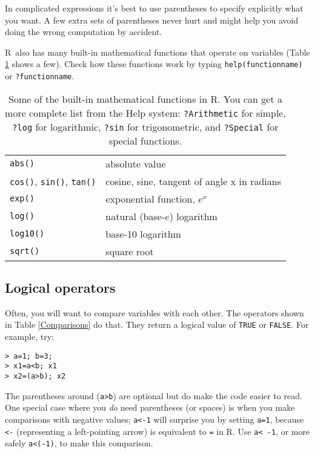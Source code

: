 \documentclass [11pt]{article}
\newcommand{\code}[1]{{\tt #1}}
\newcommand\R{{\sf R}}
\numberwithin{exercise}{section}
\begin{document}
In complicated expressions it's best to use parentheses to specify 
explicitly what you want. A few extra sets of parentheses
never hurt and might help you avoid doing the wrong computation by accident.

\R\ also has many built-in mathematical functions that operate on variables
(Table \ref{MathFunctions} shows a few). Check how these functions work by typing \code{help(functionname)} or \code{?functionname}. 
\begin{table}[t]
\begin{tabular}{p{140pt}p{290pt}}
\hline
\code{abs()} & absolute value \\
\code{cos()}, \code{sin()}, \code{tan()} &  cosine, sine, tangent of angle x in radians\\
\code{exp()}  & exponential function, $e^x$  \\
\code{log()}  & natural (base-$e$) logarithm \\
\code{log10()} &   base-10 logarithm \\
\code{sqrt()}  &  square root \\
\hline 
\end{tabular}
\caption{Some of the built-in mathematical functions in \R. You can
get a more complete list from the Help system: \code{?Arithmetic} for simple, 
\code{?log} for logarithmic, \code{?sin} for trigonometric, and \code{?Special} for special functions.} 
\label{MathFunctions}
\end{table}

\subsection{Logical operators}
Often, you will want to compare variables with each other. 
The operators shown in Table \ref{Comparisons} do that. They return a logical value of \code{TRUE} or \code{FALSE}. 
For example, try:  
\vspace{-0.1in}
\begin{verbatim}
> a=1; b=3; 
> x1=a<b; x1 
> x2=(a>b); x2
\end{verbatim}
\vspace{-0.1in}
The parentheses around (\verb+a>b+) are optional but do make
the code easier to read.
One special case where you \emph{do} need parentheses
(or spaces) is when you make comparisons with negative values;
\verb+a<-1+ will surprise you by setting \code{a=1},
because \code{<-} (representing a left-pointing arrow) is
equivalent to \code{=} in \R.  Use 
\verb+a< -1+, or more safely \verb+a<(-1)+,
to make this comparison.
\end{document}
